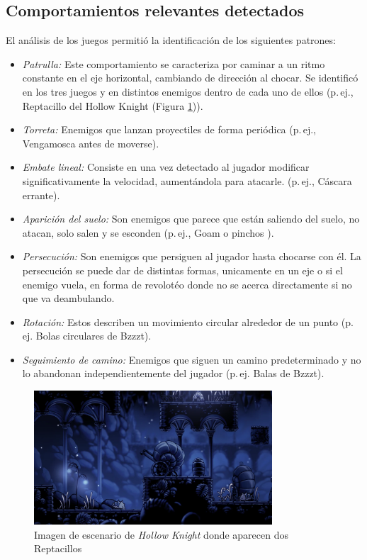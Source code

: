 \subsection{Comportamientos relevantes detectados}
El análisis de los juegos permitió la identificación de los siguientes patrones:  
\begin{itemize}
  \item \emph{Patrulla:} Este comportamiento se caracteriza por caminar a un ritmo constante en el eje horizontal, cambiando de dirección al chocar. Se identificó en los tres juegos y en distintos enemigos dentro de cada uno de ellos (p.\,ej., Reptacillo del Hollow Knight (Figura \ref{fig:Reptacillo})).  
  \item \emph{Torreta:} Enemigos que lanzan proyectiles de forma periódica  (p.\,ej., Vengamosca antes de moverse).  
  \item \emph{Embate lineal:} Consiste en una vez detectado al jugador modificar significativamente la velocidad, aumentándola para atacarle. (p.\,ej., Cáscara errante).  
  \item \emph{Aparición del suelo:} Son enemigos que parece que están saliendo del suelo, no atacan, solo salen y se esconden (p.\,ej., Goam o pinchos ).  
  \item \emph{Persecución:} Son enemigos que persiguen al jugador hasta chocarse con él. La persecución se puede dar de distintas formas, unicamente en un eje o si el enemigo vuela, en forma de revolotéo donde no se acerca directamente si no que va deambulando.
  \item \emph{Rotación:} Estos describen un movimiento circular alrededor de un punto (p.\,ej. Bolas circulares de Bzzzt).
  \item \emph{Seguimiento de camino:} Enemigos que siguen un camino predeterminado y no lo abandonan independientemente del jugador (p.\,ej. Balas de Bzzzt).
\end{itemize}

\begin{figure}[t]
	\centering
	\includegraphics[height=5cm]{Imagenes/Reptacillo_Image.png}
	\caption{Imagen de escenario de \textit{Hollow Knight} donde aparecen dos Reptacillos}
	\label{fig:Reptacillo}
\end{figure}

